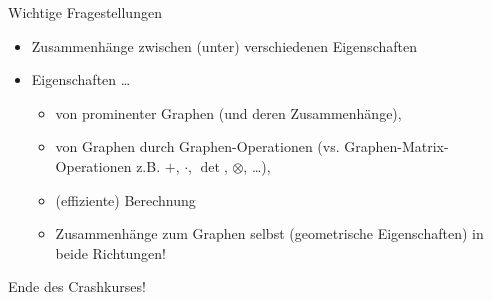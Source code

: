 \documentclass[aspectratio=169]{beamer}
\begin{document}
\begin{frame}{Wichtige Fragestellungen}

    \begin{block}{}

        \begin{itemize}

            \item Zusammenhänge zwischen (unter) verschiedenen  Eigenschaften

            \item {} Eigenschaften \dots

            \begin{itemize}
                \item von prominenter Graphen (und deren Zusammenhänge),
                \item von Graphen durch Graphen-Operationen (vs. Graphen-Matrix-Operationen z.B. $+$, $\cdot$, $\det$, $\otimes$, \dots),
                \item (effiziente) Berechnung
                \item Zusammenhänge zum Graphen selbst (geometrische Eigenschaften) in beide Richtungen!
            \end{itemize}

        \end{itemize}

    \end{block}

\end{frame}

\begin{frame}{}

    \begin{block}{}

        {
            \centering
            \huge
            Ende des Crashkurses!
        }

    \end{block}

\end{frame}

\appendix
\end{document}
